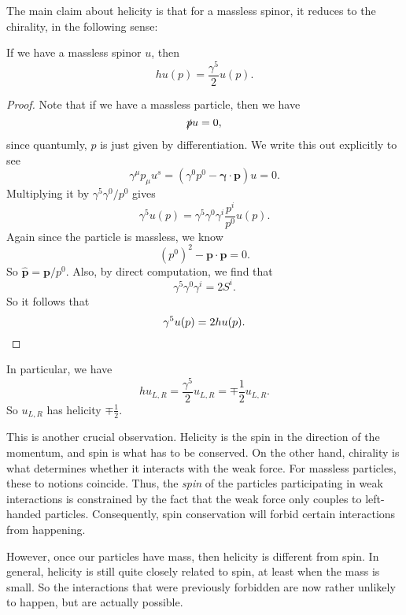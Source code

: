 \documentclass[a4paper]{article}
\begin{document}
The main claim about helicity is that for a massless spinor, it reduces to the chirality, in the following sense:
\begin{prop}
  If we have a massless spinor $u$, then
  \[
    hu(p) = \frac{\gamma^5}{2} u(p).
  \]
\end{prop}

\begin{proof}
  Note that if we have a massless particle, then we have
  \[
    \slashed p u = 0,
  \]
  since quantumly, $p$ is just given by differentiation. We write this out explicitly to see
  \[
    \gamma^\mu p_\mu u^s = (\gamma^0 p^0 - \boldsymbol \gamma \cdot \mathbf{p})u = 0.
  \]
  Multiplying it by $\gamma^5 \gamma^0/p^0$ gives
  \[
    \gamma^5 u(p) = \gamma^5 \gamma^0 \gamma^i \frac{p^i}{p^0} u(p).
  \]
  Again since the particle is massless, we know
  \[
    (p^0)^2 - \mathbf{p}\cdot \mathbf{p} = 0.
  \]
  So $\hat{\mathbf{p}} = \mathbf{p}/p^0$. Also, by direct computation, we find that
  \[
    \gamma^5 \gamma^0 \gamma^i = 2 S^i.
  \]
  So it follows that
  \[
    \gamma^5 u(p) = 2 h u(p).\qedhere
  \]
\end{proof}
In particular, we have
\[
  h u_{L, R} = \frac{\gamma^5}{2} u_{L, R} = \mp \frac{1}{2} u_{L, R}.
\]
So $u_{L, R}$ has helicity $\mp\frac{1}{2}$.

This is another crucial observation. Helicity is the spin in the direction of the momentum, and spin is what has to be conserved. On the other hand, chirality is what determines whether it interacts with the weak force. For massless particles, these to notions coincide. Thus, the \emph{spin} of the particles participating in weak interactions is constrained by the fact that the weak force only couples to left-handed particles. Consequently, spin conservation will forbid certain interactions from happening.

However, once our particles have mass, then helicity is different from spin. In general, helicity is still quite closely related to spin, at least when the mass is small. So the interactions that were previously forbidden are now rather unlikely to happen, but are actually possible.
\end{document}
